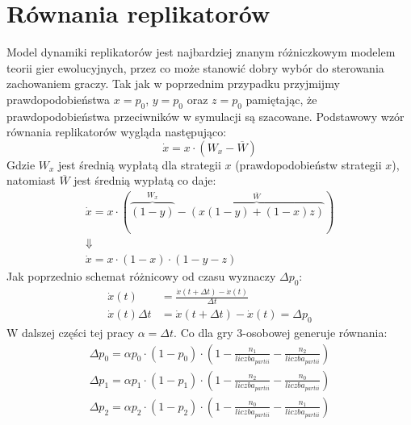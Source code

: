 \section{Równania replikatorów}
\label{sec:r_repli}
Model dynamiki replikatorów jest najbardziej znanym różniczkowym modelem teorii gier ewolucyjnych, przez co może stanowić dobry wybór do sterowania zachowaniem graczy. Tak jak w poprzednim przypadku przyjmijmy prawdopodobieństwa $x=p_0$, $y=p_0$ oraz $z=p_0$ pamiętając, że prawdopodobieństwa przeciwników w symulacji są szacowane. Podstawowy wzór równania replikatorów wygląda następująco:
\begin{equation}
\dot{x} = x \cdot ( W_x - \overline{W})
\end{equation}
Gdzie $W_x$ jest średnią wypłatą dla strategii $x$ (prawdopodobieństw strategii $x$), natomiast $\overline{W}$ jest średnią wypłatą co daje:
\begin{gather*}
\dot{x} = x \cdot ( \overbrace{(1-y)}^{W_x} - \overbrace{(x(1-y) + (1-x)z)}^{\overline{W}}) \\
\Downarrow \\
\dot{x} = x \cdot (1-x) \cdot (1-y-z)
\end{gather*}
Jak poprzednio schemat różnicowy od czasu wyznaczy $\Delta p_0$:
\begin{align*}
\dot{x}(t) &= \frac{\dot{x}(t+\Delta t)-\dot{x}(t)}{\Delta t} \\
\dot{x}(t) \Delta t &= \dot{x}(t+\Delta t)-\dot{x}(t) = \Delta p_0
\end{align*} 
W dalszej części tej pracy $\alpha=\Delta t$. Co dla gry 3-osobowej generuje równania:
\begin{align} \label{eq:repli}
\Delta p_0 = \alpha p_0 \cdot (1 - p_0) \cdot (1 - \frac{n_1}{liczba_{partii}} - \frac{n_2}{liczba_{partii}}) \nonumber \\
\Delta p_1 = \alpha p_1 \cdot (1 - p_1) \cdot (1 - \frac{n_2}{liczba_{partii}} - \frac{n_0}{liczba_{partii}}) \\
\Delta p_2 = \alpha p_2 \cdot (1 - p_2) \cdot (1 - \frac{n_0}{liczba_{partii}} - \frac{n_1}{liczba_{partii}}) \nonumber
\end{align} 


